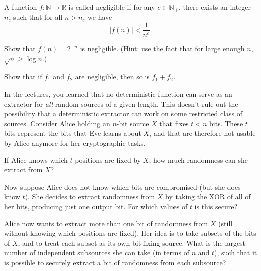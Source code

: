 \documentclass[a4paper,10pt,landscape,twocolumn]{scrartcl}
\begin{document}
\begin{exercise}
	A function $f: \mathbb{N} \to \mathbb{R}$ is called negligible if for any $c \in \mathbb{N}_+$, there exists an integer $n_c$ such that for all $n > n_c$ we have
	\[
	|f(n)| < \frac{1}{n^c}.
	\]
	\begin{subex}
		Show that $f(n) = 2^{-n}$ is negligible. (Hint: use the fact that for large enough $n$, $\sqrt{n} \geq \log n$.)
	\end{subex}
    \begin{subex}
    	Show that if $f_1$ and $f_2$ are negligible, then so is $f_1 + f_2$.
    \end{subex}

\end{exercise}

\begin{exercise}
	In the lectures, you learned that no deterministic function can serve as an extractor for \emph{all} random sources of a given length. This doesn't rule out the possibility that a deterministic extractor can work on some restricted class of sources. Consider Alice holding an $n$-bit source $X$ that fixes $t < n$ bits. These $t$ bits represent the bits that Eve learns about $X$, and that are therefore not usable by Alice anymore for her cryptographic tasks.
	\begin{subex}
		If Alice knows which $t$ positions are fixed by $X$, how much randomness can she extract from $X$?
	\end{subex}
	\begin{subex}
		Now suppose Alice does not know which bits are compromised (but she does know $t$). She decides to extract randomness from $X$ by taking the XOR of all of her bits, producing just one output bit. For which values of $t$ is this secure?
	\end{subex}
    \begin{subex}
   	    Alice now wants to extract more than one bit of randomness from $X$ (still without knowing which positions are fixed). Her idea is to take subsets of the bits of $X$, and to treat each subset as its own bit-fixing source. What is the largest number of independent subsources she can take (in terms of $n$ and $t$), such that it is possible to securely extract a bit of randomness from each subsource?
   	\end{subex}
\end{exercise}
\end{document}
